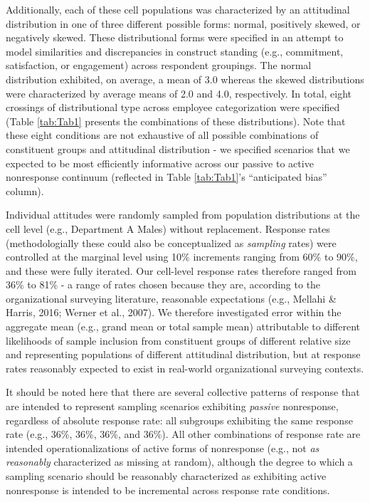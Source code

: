 \documentclass[
  man,mask]{apa7}
\begin{document}
Additionally, each of these cell populations was characterized by an attitudinal distribution in one of three different possible forms: normal, positively skewed, or negatively skewed. These distributional forms were specified in an attempt to model similarities and discrepancies in construct standing (e.g., commitment, satisfaction, or engagement) across respondent groupings. The normal distribution exhibited, on average, a mean of 3.0 whereas the skewed distributions were characterized by average means of 2.0 and 4.0, respectively. In total, eight crossings of distributional type across employee categorization were specified (Table \ref{tab:Tab1} presents the combinations of these distributions). Note that these eight conditions are not exhaustive of all possible combinations of constituent groups and attitudinal distribution - we specified scenarios that we expected to be most efficiently informative across our passive to active nonresponse continuum (reflected in Table \ref{tab:Tab1}'s ``anticipated bias'' column).

Individual attitudes were randomly sampled from population distributions at the cell level (e.g., Department A Males) without replacement. Response rates (methodologially these could also be conceptualized as \emph{sampling} rates) were controlled at the marginal level using 10\% increments ranging from 60\% to 90\%, and these were fully iterated. Our cell-level response rates therefore ranged from 36\% to 81\% - a range of rates chosen because they are, according to the organizational surveying literature, reasonable expectations (e.g., Mellahi \& Harris, 2016; Werner et al., 2007). We therefore investigated error within the aggregate mean (e.g., grand mean or total sample mean) attributable to different likelihoods of sample inclusion from constituent groups of different relative size and representing populations of different attitudinal distribution, but at response rates reasonably expected to exist in real-world organizational surveying contexts.

It should be noted here that there are several collective patterns of response that are intended to represent sampling scenarios exhibiting \emph{passive} nonresponse, regardless of absolute response rate: all subgroups exhibiting the same response rate (e.g., 36\%, 36\%, 36\%, and 36\%). All other combinations of response rate are intended operationalizations of active forms of nonresponse (e.g., not \emph{as reasonably} characterized as missing at random), although the degree to which a sampling scenario should be reasonably characterized as exhibiting active nonresponse is intended to be incremental across response rate conditions.
\end{document}
